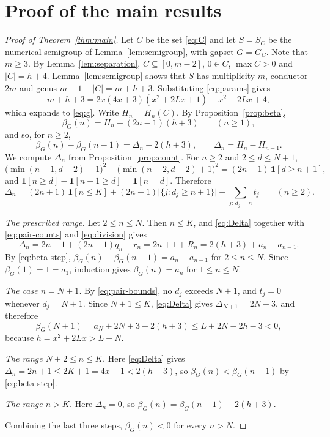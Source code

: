 \documentclass[11pt]{amsart}
\theoremstyle{definition}
\theoremstyle{remark}
\numberwithin{equation}{section}
\newcommand{\ind}[1]{\mathbf{1}[#1]}
\begin{document}
\section{Proof of the main results}\label{sec:proof}

\begin{proof}[Proof of Theorem~\ref{thm:main}]
Let $C$ be the set \eqref{eq:C} and let $S=S_C$ be the numerical semigroup of Lemma~\ref{lem:semigroup}, with gapset $G=G_C$. Note that $m\ge 3$. By Lemma~\ref{lem:separation}, $C\subseteq[0,m-2]$, $0\in C$, $\max C>0$ and $|C|=h+4$. Lemma~\ref{lem:semigroup} shows that $S$ has multiplicity $m$, conductor $2m$ and genus $m-1+|C|=m+h+3$. Substituting \eqref{eq:params} gives
\[
m+h+3=2x(4x+3)(x^2+2Lx+1)+x^2+2Lx+4,
\]
which expands to \eqref{eq:g}. Write $H_n=H_n(C)$. By Proposition~\ref{prop:beta},
\[
\beta_G(n)=H_n-(2n-1)(h+3)\qquad(n\ge1),
\]
and so, for $n\ge 2$,
\begin{equation}\label{eq:beta-step}
\beta_G(n)-\beta_G(n-1)=\Delta_n-2(h+3),\qquad \Delta_n=H_n-H_{n-1}.
\end{equation}
We compute $\Delta_n$ from Proposition~\ref{prop:count}. For $n\ge 2$ and $2\le d\le N+1$,
\[
\bigl(\min(n-1,d-2)+1\bigr)^2-\bigl(\min(n-2,d-2)+1\bigr)^2=(2n-1)\,\ind{d\ge n+1},
\]
and $\ind{n\ge d}-\ind{n-1\ge d}=\ind{n=d}$. Therefore
\begin{equation}\label{eq:Delta}
\Delta_n=(2n+1)\,\ind{n\le K}+(2n-1)\bigl|\{j:d_j\ge n+1\}\bigr|+\sum_{j:\,d_j=n}t_j\qquad(n\ge 2).
\end{equation}

\emph{The prescribed range.} Let $2\le n\le N$. Then $n\le K$, and \eqref{eq:Delta} together with \eqref{eq:pair-counts} and \eqref{eq:division} gives
\[
\Delta_n=2n+1+(2n-1)q_n+r_n=2n+1+R_n=2(h+3)+a_n-a_{n-1}.
\]
By \eqref{eq:beta-step}, $\beta_G(n)-\beta_G(n-1)=a_n-a_{n-1}$ for $2\le n\le N$. Since $\beta_G(1)=1=a_1$, induction gives $\beta_G(n)=a_n$ for $1\le n\le N$.

\emph{The case $n=N+1$.} By \eqref{eq:pair-bounds}, no $d_j$ exceeds $N+1$, and $t_j=0$ whenever $d_j=N+1$. Since $N+1\le K$, \eqref{eq:Delta} gives $\Delta_{N+1}=2N+3$, and therefore
\[
\beta_G(N+1)=a_N+2N+3-2(h+3)\le L+2N-2h-3<0,
\]
because $h=x^2+2Lx>L+N$.

\emph{The range $N+2\le n\le K$.} Here \eqref{eq:Delta} gives $\Delta_n=2n+1\le 2K+1=4x+1<2(h+3)$, so $\beta_G(n)<\beta_G(n-1)$ by \eqref{eq:beta-step}.

\emph{The range $n>K$.} Here $\Delta_n=0$, so $\beta_G(n)=\beta_G(n-1)-2(h+3)$.

Combining the last three steps, $\beta_G(n)<0$ for every $n>N$.
\end{proof}
\end{document}
